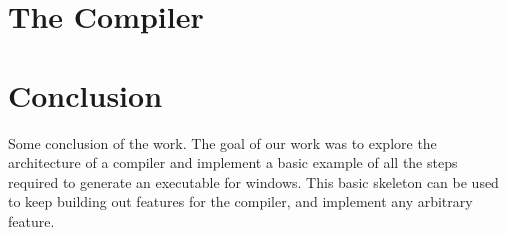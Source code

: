 \documentclass[a4paper,oneside,onecolumn,12pt]{LegrandOrangeBook}
\begin{document}
\chapter{The Compiler}

\chapter*{Conclusion}
Some conclusion of the work.
The goal of our work was to explore the architecture of a compiler and implement a basic example of all the steps required to generate an executable for windows. This basic skeleton can be used to keep building out features for the compiler, and implement any arbitrary feature.

\pagebreak



\pagebreak
\thispagestyle{empty}

\mbox{}
\vfill

\end{document}
